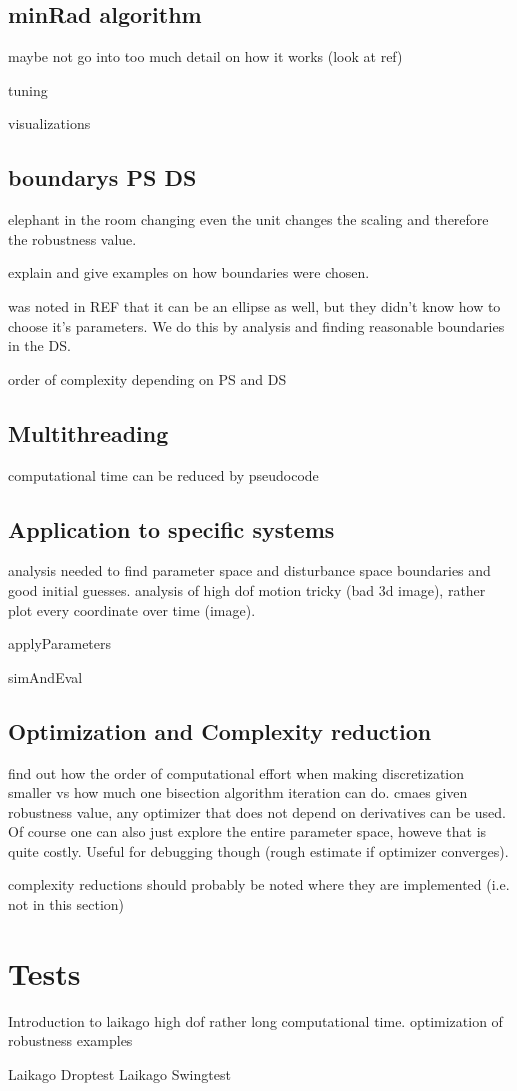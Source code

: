 \subsection{minRad algorithm}

    maybe not go into too much detail on how it works (look at ref)

    tuning

    visualizations

\subsection{boundarys PS DS}

    

    elephant in the room 
    changing even the unit changes the scaling and therefore the robustness value.

    explain and give examples on how boundaries were chosen. 

    was noted in REF that it can be an ellipse as well, but they didn't know how to choose it's parameters. We do this by analysis and finding reasonable boundaries in the DS.

    order of complexity depending on PS and DS

\subsection{Multithreading}

    computational time can be reduced by 
    pseudocode

\subsection{Application to specific systems}
    
    analysis needed to find parameter space and disturbance space boundaries and good initial guesses.
    analysis of high dof motion tricky (bad 3d image), rather plot every coordinate over time (image). 

    applyParameters

    simAndEval

\subsection{Optimization and Complexity reduction}
    

    find out how the order of computational effort when making discretization smaller vs how much one bisection algorithm iteration can do. 
    cmaes
    given robustness value, any optimizer that does not depend on derivatives can be used. 
    Of course one can also just explore the entire parameter space, howeve that is quite costly. Useful for debugging though (rough estimate if optimizer converges).

    complexity reductions should probably be noted where they are implemented (i.e. not in this section)

\section{Tests}


    Introduction to laikago
        high dof
        rather long computational time. 
    optimization of robustness examples

    Laikago Droptest
    Laikago Swingtest
